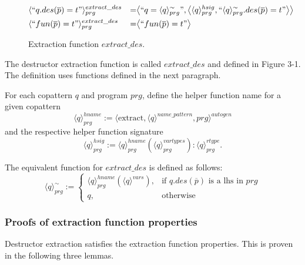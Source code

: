 \begin{figure}
\vspace{2.4in}
\begin{alignat*}{3}
& \langle `` q.des(\overline{p}) = t " \rangle^{extract\_des}_{prg} &= &\big\langle `` q =  \langle q \rangle^{\sim}_{prg} ", \big\langle \langle q \rangle^{hsig}_{prg}, `` \langle q \rangle^{\sim}_{prg}.des(\overline{p}) = t  " \big\rangle \big\rangle \span\span \\
& \langle `` fun(\overline{p}) = t " \rangle^{extract\_des}_{prg} &= &\big\langle `` fun(\overline{p}) = t " \big\rangle \span\span
\end{alignat*}
\caption{Extraction function $extract\_des$.}
\end{figure}

The destructor extraction function is called $extract\_des$ and defined in Figure 3-1. The definition uses functions defined in the next paragraph.

For each copattern $q$ and program $prg$, define the helper function name for a given copattern
\begin{equation*}
\langle q \rangle^{hname}_{prg} := \langle \textrm{extract}, \langle q \rangle^{name\_pattern}, prg \rangle^{autogen}
\end{equation*}
and the respective helper function signature
\begin{equation*}
\langle q \rangle^{hsig}_{prg} := \langle q \rangle^{hname}_{prg}(\langle q \rangle^{vartypes}_{prg}): \langle q \rangle^{rtype}_{prg}.
\end{equation*}

The equivalent function for $extract\_des$ is defined as follows:
\[
    \langle q \rangle^{\sim}_{prg} :=
\begin{cases}
    \langle q \rangle^{hname}_{prg}(\langle q \rangle^{vars}),& \text{if $q.des(\overline{p})$ is a lhs in $prg$} \\
    q,                                                                                      & \text{otherwise}
\end{cases}
\]

\subsubsection{Proofs of extraction function properties}

Destructor extraction satisfies the extraction function properties. This is proven in the following three lemmas.

